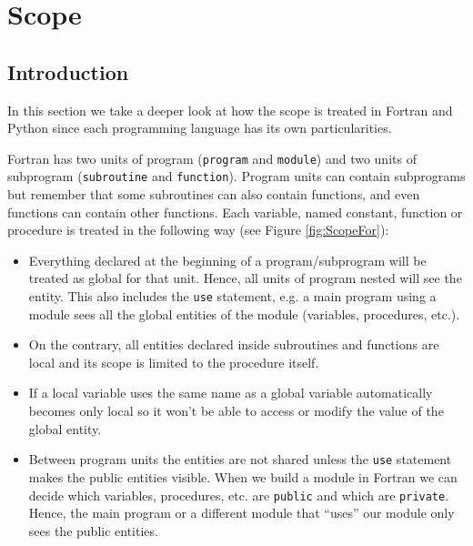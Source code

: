 \chapter{Scope} 
 
    \section{Introduction}

In this section we take a deeper look at how the scope is treated in Fortran and Python since each programming language has its own particularities. 

Fortran has two units of program (\texttt{program} and \texttt{module}) and two units of subprogram (\texttt{subroutine} and \texttt{function}).
Program units can contain subprograms but remember that some subroutines can also contain functions, and even functions can contain other functions. 
Each variable, named constant, function or procedure is treated in the following way (see Figure \ref{fig:ScopeFor}):
\begin{itemize}
    \item Everything declared at the beginning of a program/subprogram will be treated as global for that unit. Hence, all units of program nested will see the entity.
    This also includes the \texttt{use} statement, e.g. a main program using a module sees all the global entities of the module (variables, procedures, etc.). 
    
    \item On the contrary, all entities declared inside subroutines and functions are local and its scope is limited to the procedure itself. 
    
    \item If a local variable uses the same name as a global variable automatically becomes only local so it won't be able to access or modify the value of the global entity. 
    
    \item Between program units the entities are not shared unless the \texttt{use} statement makes the public entities visible. 
    When we build a module in Fortran we can decide which variables, procedures, etc. are \texttt{public} and which are \texttt{private}. 
    Hence, the main program or a different module that ``uses'' our module only sees the public entities.
\end{itemize}
 
